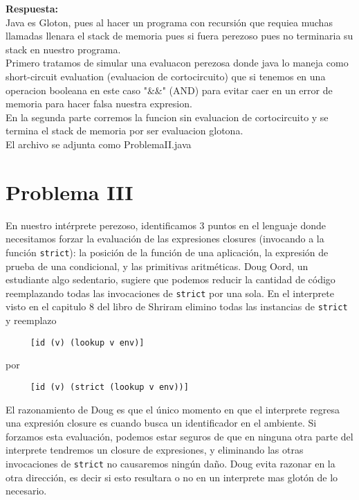 \documentclass[12pt]{article}
\begin{document}
\textbf{Respuesta: }\\
Java es Gloton, pues al hacer un programa con recursión que requiea muchas llamadas llenara el stack de memoria pues si fuera perezoso pues no terminaria su stack en nuestro programa.\\

Primero tratamos de simular una evaluacon perezosa donde java lo maneja como short-circuit evaluation (evaluacion de cortocircuito) que si tenemos en una operacion booleana en este caso "\&\&" (AND) para evitar caer en un error de memoria para hacer falsa nuestra expresion.\\
En la segunda parte corremos la funcion sin evaluacion de cortocircuito y se termina el stack de memoria por ser evaluacion glotona.\\

El archivo se adjunta como ProblemaII.java



\section*{Problema III}
En nuestro intérprete perezoso, identificamos 3 puntos en el lenguaje donde
necesitamos forzar la evaluación de las expresiones closures (invocando a la
función \texttt{strict}): la posición de la función de una aplicación,
la expresión de prueba de una condicional, y las primitivas aritméticas.
Doug Oord, un estudiante algo sedentario, sugiere que podemos reducir
la cantidad de código reemplazando todas las invocaciones de \texttt{strict}
por una sola. En el interprete visto en el capitulo 8 del libro de Shriram
elimino todas las instancias de \texttt{strict} y reemplazo
\begin{verbatim}
     [id (v) (lookup v env)]
\end{verbatim}

por

\begin{verbatim}
     [id (v) (strict (lookup v env))]
\end{verbatim}

El razonamiento de Doug es que el único momento en que el interprete regresa una
expresión closure es cuando busca un identificador en el ambiente. Si forzamos
esta evaluación, podemos estar seguros de que en ninguna otra parte del interprete
tendremos un closure de expresiones, y eliminando las otras invocaciones de
\texttt{strict} no causaremos ningún daño. Doug evita razonar en la otra dirección,
es decir si esto resultara o no en un interprete mas glotón de lo necesario.
\end{document}
